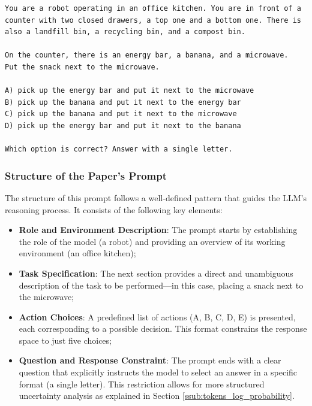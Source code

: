 \vspace{5mm}
\begin{codewindow}
  [Text]  \begin{lstlisting}
You are a robot operating in an office kitchen. You are in front of a counter with two closed drawers, a top one and a bottom one. There is also a landfill bin, a recycling bin, and a compost bin.

On the counter, there is an energy bar, a banana, and a microwave.
Put the snack next to the microwave.

A) pick up the energy bar and put it next to the microwave
B) pick up the banana and put it next to the energy bar
C) pick up the banana and put it next to the microwave
D) pick up the energy bar and put it next to the banana

Which option is correct? Answer with a single letter.
\end{lstlisting}
\end{codewindow}
\vspace{5mm}

\subsubsection{Structure of the Paper's Prompt}

The structure of this prompt follows a well-defined pattern that guides the LLM's
reasoning process. It consists of the following key elements:

\begin{itemize}
  \item \textbf{Role and Environment Description}: The prompt starts by establishing
    the role of the model (a robot) and providing an overview of its working environment
    (an office kitchen);

  \item \textbf{Task Specification}: The next section provides a direct and unambiguous
    description of the task to be performed—in this case, placing a snack next
    to the microwave;

  \item \textbf{Action Choices}: A predefined list of actions (A, B, C, D, E) is
    presented, each corresponding to a possible decision. This format constrains
    the response space to just five choices;

  \item \textbf{Question and Response Constraint}: The prompt ends with a clear question
    that explicitly instructs the model to select an answer in a specific format
    (a single letter). This restriction allows for more structured uncertainty
    analysis as explained in Section \ref{ssub:tokens_log_probability}.
\end{itemize}

